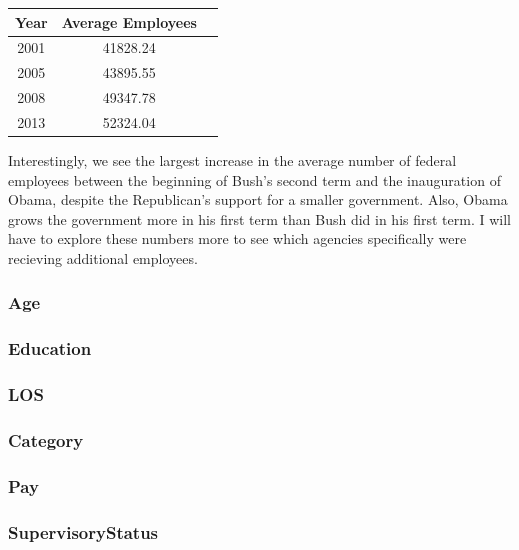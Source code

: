 \documentclass{article}
\begin{document}
            \begin{center}
                \begin{tabular}{ |c|c|c| }
                    \hline
                    Year & Average Employees \\
                    \hline
                    2001 & 41828.24 \\
                    2005 & 43895.55 \\
                    2008 & 49347.78 \\
                    2013 & 52324.04 \\
                    \hline
                \end{tabular}
            \end{center}

        Interestingly, we see the largest increase in the average number of federal employees between the beginning of Bush's second term and the inauguration of Obama, despite the Republican's support for a smaller government. Also, Obama grows the government more in his first term than Bush did in his first term. I will have to explore these numbers more to see which agencies specifically were recieving additional employees.

        \subsubsection{Age}
        

        \subsubsection{Education}

        \subsubsection{LOS}

        \subsubsection{Category}

        \subsubsection{Pay}

        \subsubsection{SupervisoryStatus}
\end{document}
